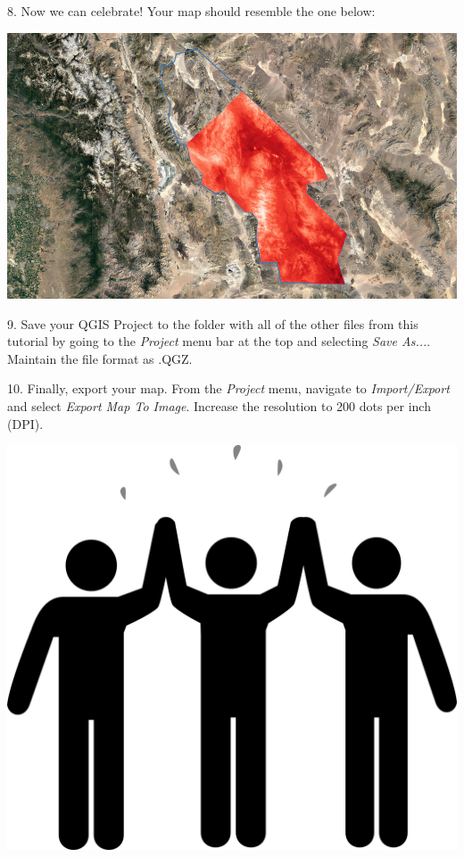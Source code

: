 \documentclass[oneside,a4paper,11pt,explicit]{book}
\begin{document}
\vspace{1em}

8. Now we can celebrate! Your map should resemble the one below:

\vspace{1em}

\centerline{\includegraphics[width=\textwidth]{TempMap1}}

\vspace{1em}


\newpage

9. Save your QGIS Project to the folder with all of the other files from this tutorial by going to the \textit{Project} menu bar at the top and selecting \textit{Save As...}. Maintain the file format as .QGZ.

10. Finally, export your map. From the \textit{Project} menu, navigate to \textit{Import/Export} and select \textit{Export Map To Image}. Increase the resolution to 200 dots per inch (DPI). 

\vspace{1em}

\centerline{\includegraphics[width=.25\textwidth]{high_five.png}}

\vspace{1em}
\end{document}
